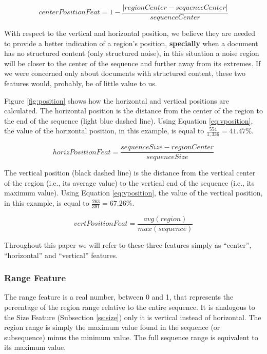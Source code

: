 \begin{equation}\label{eq:cposition}
    centerPositionFeat = 1 - \frac{|regionCenter - sequenceCenter|}{sequenceCenter}
\end{equation}

With respect to the vertical and horizontal position, we believe they are needed
to provide a better indication of a region's position, \textbf{specially}
when a document has no structured content (only structured noise), in this situation a
noise region will be closer to the center of the sequence and further away from
its extremes. If we were concerned only about documents with structured content,
these two features would, probably, be of little value to us.

Figure \ref{fig:position} shows how the horizontal and vertical positions are
calculated. The horizontal position is the distance from the center of the
region to the end of the sequence (light blue dashed line). Using Equation
\ref{eq:vposition}, the value of the horizontal position, in this example, is
equal to $\frac{554}{1,336} = 41.47\%$.

\begin{equation}\label{eq:hposition}
    horizPositionFeat = \frac{sequenceSize - regionCenter}{sequenceSize}
\end{equation}

The vertical position (black dashed line) is the distance from the vertical
center of the region (i.e., its average value) to the vertical end of the
sequence (i.e., its maximum value). Using Equation \ref{eq:vposition}, the value
of the vertical position, in this example, is equal to $\frac{263}{391} =
67.26\%$.

\begin{equation}\label{eq:vposition}
    vertPositionFeat = \frac{avg(region)}{max(sequence)}
\end{equation}

Throughout this paper we will refer to these three features simply as
``center'', ``horizontal'' and ``vertical'' features.

\subsubsection{Range Feature}\label{ss:range}
The range feature is a real number, between 0 and 1, that represents the
percentage of the region range relative to the entire sequence. It is analogous
to the Size Feature (Subsection \ref{ss:size}) only it is vertical instead of
horizontal. The region range is simply the maximum value found in the sequence
(or subsequence) minus the minimum value. The full sequence range is equivalent
to its maximum value.

